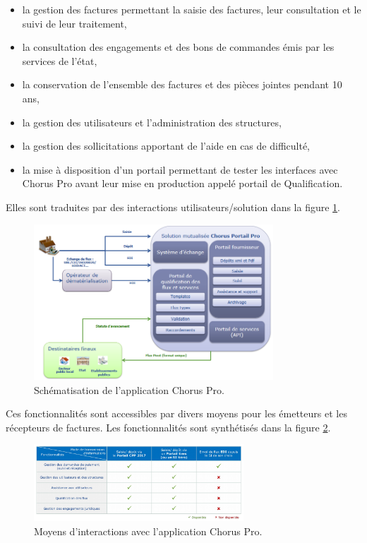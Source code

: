 \documentclass[12pt,a4paper]{article}
\begin{document}
\begin{itemize}
\item la gestion des factures permettant la saisie des factures, leur consultation et le suivi de leur traitement,
\item la consultation des engagements et des bons de commandes émis par les
services de l’état,
\item la conservation de l’ensemble des factures et des pièces jointes pendant 10 ans,
\item la gestion des utilisateurs et l'administration des structures,
\item la gestion des sollicitations apportant de l'aide en cas de difficulté,
\item la mise à disposition d'un portail permettant de tester les interfaces avec Chorus Pro avant leur mise en production appelé portail de Qualification.
\end{itemize}
Elles sont traduites par des interactions utilisateurs/solution dans la figure \ref{schematisation}.
\begin{figure}[H]
	\begin{center}
		\includegraphics[width=0.8\textwidth,height=\textheight,keepaspectratio]{solutionSimplifiee.png}
		\caption{Schématisation de l'application Chorus Pro.}
		\label{schematisation}
	\end{center}
\end{figure}
\clearpage
\newpage
Ces fonctionnalités sont accessibles par divers moyens pour les émetteurs et les récepteurs de factures. Les fonctionnalités sont synthétisés dans la figure \ref{tableauMoyens}.
\begin{figure}[H]
	\begin{center}
		\includegraphics[width=0.7\textwidth,height=\textheight,keepaspectratio]{tableauMoyensFonctionnalites.png}
		\caption{Moyens d'interactions avec l'application Chorus Pro.}
		\label{tableauMoyens}
	\end{center}
\end{figure}
\end{document}

